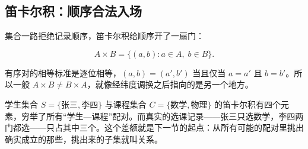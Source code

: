 \subsection{笛卡尔积：顺序合法入场}

集合一路拒绝记录顺序，笛卡尔积给顺序开了一扇门：

\[
A\times B=\{(a,b):a\in A,\; b\in B\}.
\]

有序对的相等标准是逐位相等，\((a,b)=(a',b')\) 当且仅当 \(a=a'\) 且 \(b=b'\)。所以一般 \(A\times B\ne B\times A\)，就像经纬度调换之后指向的是另一个地方。

学生集合 \(S=\{\text{张三},\text{李四}\}\) 与课程集合 \(C=\{\text{数学},\text{物理}\}\) 的笛卡尔积有四个元素，穷举了所有``学生—课程''配对。而真实的选课记录——张三只选数学，李四两门都选——只占其中三个。这个差额就是下一节的起点：从所有可能的配对里挑出确实成立的那些，挑出来的子集就叫关系。
